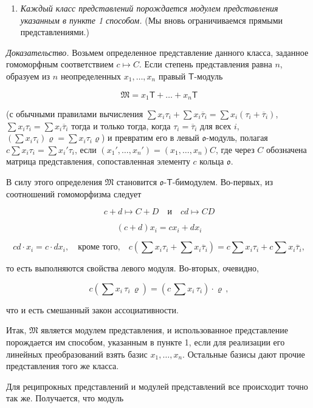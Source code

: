 \documentclass[11pt]{article}
\providecommand{\tightlist}{\setlength{\itemsep}{0pt}\setlength{\parskip}{0pt}}
\begin{document}
\begin{enumerate}
\def\labelenumi{\arabic{enumi}.}
\setcounter{enumi}{1}
\tightlist
\item
  \emph{Каждый класс представлений порождается модулем представления указанным в пункте 1 способом.} (Мы вновь ограничиваемся прямыми представлениями.)
\end{enumerate}

\emph{Доказательство.} Возьмем определенное представление данного класса, заданное гомоморфным соответствием \(c\mapsto C\). Если степень представления равна \(n\), образуем из \(n\) неопределенных \(x_1,\ldots,x_n\) правый \(\mathsf T\)-модуль

\[\mathfrak{M} = x_1 \mathsf{T} + \dots + x_n \mathsf{T}\]

(с обычными правилами вычисления \(\sum x_i\tau_i+\sum x_i\overline{\tau}_i=\sum x_i(\tau_i+\overline{\tau}_i)\), \(\sum x_i\tau_i=\sum x_i\overline{\tau}_i\) тогда и только тогда, когда \(\tau_i=\overline{\tau}_i\) для всех \(i\), \((\sum x_i\tau_i)\varrho=\sum x_i\tau_i\varrho\)) и превратим его в левый \(\mathfrak{o}\)-модуль, полагая \(c\sum x_i\tau_i=\sum x_i'\tau_i\), если \((x_1',\ldots,x_n')=(x_1,\ldots,x_n)C\), где через \(C\) обозначена матрица представления, сопоставленная элементу \(c\) кольца \(\mathfrak{o}\).

В силу этого определения \(\mathfrak M\) становится \(\mathfrak{o}\)-\(\mathsf T\)-бимодулем. Во-первых, из соотношений гомоморфизма следует

\[
c+d\mapsto C+D \quad \text{и} \quad cd\mapsto CD
\]

\[
(c+d)x_i=cx_i+dx_i
\]

\[
cd\cdot x_i=c\cdot dx_i,\quad\text{кроме того,}\quad
c\left(\sum x_i\tau_i+\sum x_i\overline{\tau}_i\right)
=c\sum x_i\tau_i+c\sum x_i\overline{\tau}_i,
\]

то есть выполняются свойства левого модуля. Во-вторых, очевидно,

\[c(\sum x_i \, \tau_i \, \varrho) = (c \, \sum x_i \, \tau_i) \cdot \varrho \,,\]

что и есть смешанный закон ассоциативности.

Итак, \(\mathfrak{M}\) является модулем представления, и использованное представление порождается им способом, указанным в пункте 1, если для реализации его линейных преобразований взять базис \(x_1, \ldots, x_n\). Остальные базисы дают прочие представления того же класса.

Для реципрокных представлений и модулей представлений все происходит точно так же. Получается, что модуль
\end{document}

